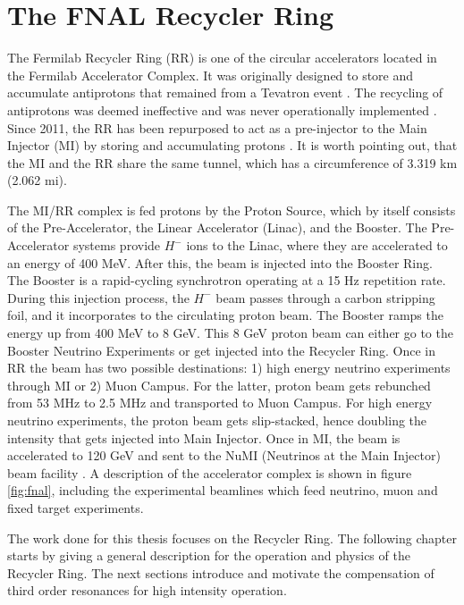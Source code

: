 \chapter{The FNAL Recycler Ring}
\label{sec:ch3}

The Fermilab Recycler Ring (RR) is one of the circular accelerators located in the Fermilab Accelerator Complex. It was originally designed to store and accumulate antiprotons that remained from a Tevatron event \cite{rr0}. The recycling of antiprotons was deemed ineffective and was never operationally implemented \cite{rrnagaitsev}. Since 2011, the RR has been repurposed to act as a pre-injector to the Main Injector (MI) by storing and accumulating protons \cite{rr1}. It is worth pointing out, that the MI and the RR share the same tunnel, which has a circumference of 3.319 km (2.062 mi).

The MI/RR complex is fed protons by the Proton Source, which by itself consists of the Pre-Accelerator, the Linear Accelerator (Linac), and the Booster. The Pre-Accelerator systems provide $H^-$ ions to the Linac, where they are accelerated to an energy of 400 MeV. After this, the beam is injected into the Booster Ring. The Booster is a rapid-cycling synchrotron operating at a 15 Hz repetition rate. During this injection process, the $H^-$ beam passes through a carbon stripping foil, and it incorporates to the circulating proton beam. The Booster ramps the energy up from 400 MeV to 8 GeV. This 8 GeV proton beam can either go to the Booster Neutrino Experiments or get injected into the Recycler Ring. Once in RR the beam has two possible destinations: 1) high energy neutrino experiments through MI or 2) Muon Campus. For the latter, proton beam gets rebunched from 53 MHz to 2.5 MHz and transported to Muon Campus. For high energy neutrino experiments, the proton beam gets slip-stacked, hence doubling the intensity that gets injected into Main Injector. Once in MI, the beam is accelerated to 120 GeV and sent to the NuMI (Neutrinos at the Main Injector) beam facility \cite{rr1, rrnagaitsev, numi1}. A description of the accelerator complex is shown in figure \ref{fig:fnal}, including the experimental beamlines which feed neutrino, muon and fixed target experiments.

The work done for this thesis focuses on the Recycler Ring. The following chapter starts by giving a general description for the operation and physics of the Recycler Ring. The next sections introduce and motivate the compensation of third order resonances for high intensity operation.     

